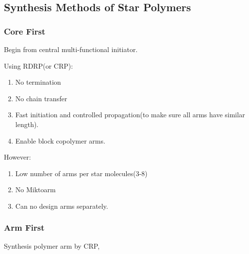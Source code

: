 \documentclass{NoteThesis/note-thesis}
\begin{document}
\subsection{Synthesis Methods of Star Polymers}

\subsubsection*{Core First}

Begin from central multi-functional initiator.

Using RDRP(or CRP):

\begin{enumerate}
    \item No termination
    \item No chain transfer
    \item Fast initiation and controlled propagation(to make sure all arms have similar length).
    \item Enable block copolymer arms.
\end{enumerate}

However:

\begin{enumerate}
    \item Low number of arms per star molecules(3-8)
    \item No Miktoarm
    \item Can no design arms separately.
\end{enumerate}

\subsubsection*{Arm First}

Synthesis polymer arm by CRP, 
\end{document}
